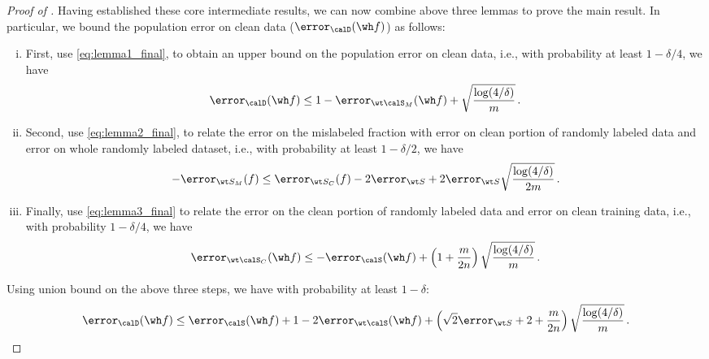 \begin{proof}[Proof of ] 
    Having established these core intermediate results, we can now combine above three lemmas to prove the main result. 
    In particular, we bound the population error on clean data ($\error_\calD(\wh f)$) as follows:  
    \begin{enumerate}[(i)]
        \item First, use \eqref{eq:lemma1_final}, to obtain an upper bound on the population error on clean data, i.e., with probability at least $1-\delta/4$, we have
        \begin{align}
            \error_{ \calD} (\wh f) \le 1 - \error_{ \wt \calS_M}(\wh f) + \sqrt{\frac{\log(4/\delta)}{m}} \,. 
        \end{align}
        \item  Second, use \eqref{eq:lemma2_final}, to relate the error on the mislabeled fraction with error on clean portion of randomly labeled data and error on whole randomly labeled dataset, i.e., with probability at least $1-\delta/2$, we have 
        \begin{align}
            - \error_{\wt S_M}(f) \le \error_{\wt S_C}(f) - 2\error_{\wt S}  + 2\error_{\wt S} \sqrt{\frac{\log(4/\delta)}{2m}}  \,. 
        \end{align} 
        \item Finally, use \eqref{eq:lemma3_final} to relate the error on the clean portion of randomly labeled data and error on clean training data, i.e., with probability $1-\delta/4$, we have 
        \begin{align}
            \error_{\wt \calS_C} (\wh f)\le - \error_{\calS}( \wh f) + \left(1 + \frac{m}{2n} \right) \sqrt{\frac{\log(4/\delta)}{m}} \,. 
        \end{align} 
    \end{enumerate}

    Using union bound on the above three steps, we have with probability at least $1-\delta$: 
    \begin{align}
        \error_\calD (\wh f) \le \error_{\calS}(\wh f)   + 1 - 2\error_{\wt \calS}(\wh f)   + \left(\sqrt{2} \error_{\wt S} + 2 + \frac{m}{2n}\right)  \sqrt{\frac{\log(4/\delta)}{m}} \,.
    \end{align}
\end{proof}

